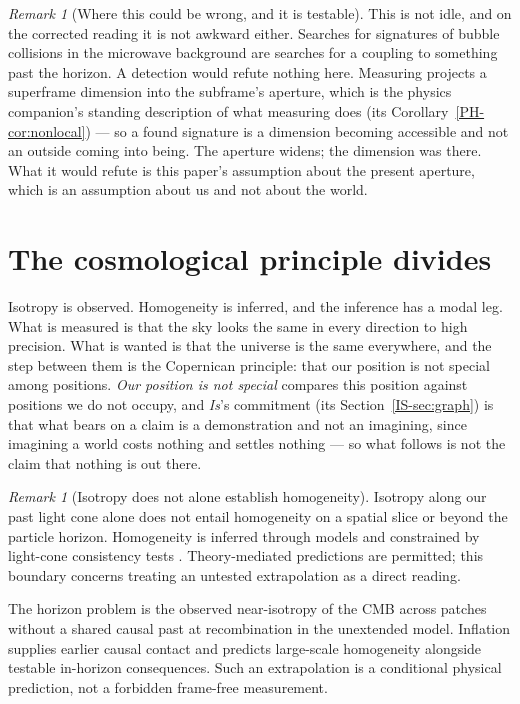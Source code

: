 \documentclass[11pt,a4paper]{article}
\theoremstyle{remark}\newtheorem{remark}[definition]{Remark}
\begin{document}
\begin{remark}[Where this could be wrong, and it is testable]\label{rem:bubble}
This is not idle, and on the corrected reading it is not awkward either. Searches for signatures
of bubble collisions in the microwave background \citep{feeney2011,planck2016} are searches for a
coupling to something past the horizon. A detection would refute nothing here. Measuring projects a
superframe dimension into the subframe's aperture, which is the physics companion's standing
description of what measuring does (its Corollary~\ref{PH-cor:nonlocal}) --- so a found signature is
a dimension becoming accessible and not an outside coming into being. The
aperture widens; the dimension was there. What it would refute is this paper's assumption about the
present aperture, which is an assumption about us and not about the world.
\end{remark}

\section{The cosmological principle divides}\label{sec:cosmological-principle}
Isotropy is observed. Homogeneity is inferred, and the inference has a modal leg. What is measured
is that the sky looks the same in every direction to high precision. What is wanted is that the universe
is the same everywhere, and the step between them is the Copernican principle: that our position is not
special among positions. \emph{Our position is not special} compares this position against positions
we do not occupy, and \emph{Is}'s commitment (its Section~\ref{IS-sec:graph}) is that what bears on a
claim is a demonstration and not an imagining, since imagining a world costs nothing and settles
nothing --- so what follows is not the claim that nothing is out there.

\begin{remark}[Isotropy does not alone establish homogeneity]\label{prop:copernican}
Isotropy along our past light cone alone does not entail homogeneity on a
spatial slice or beyond the particle horizon. Homogeneity is inferred through
models and constrained by light-cone consistency tests
\citep{clarkson2012,maartens2011}. Theory-mediated predictions are permitted;
this boundary concerns treating an untested extrapolation as a direct reading.
\end{remark}
The horizon problem is the observed near-isotropy of the CMB across patches
without a shared causal past at recombination in the unextended model.
Inflation supplies earlier causal contact and predicts large-scale homogeneity
alongside testable in-horizon consequences. Such an extrapolation is a
conditional physical prediction, not a forbidden frame-free measurement.
\end{document}
